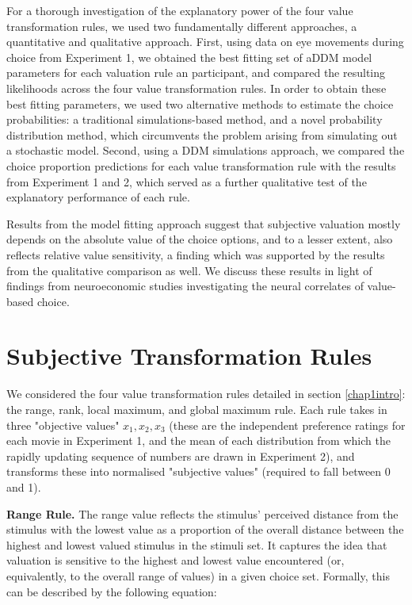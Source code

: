 \documentclass[11pt,a4paper]{article}
\begin{document}
For a thorough investigation of the explanatory power of the four value transformation rules, we used two fundamentally different approaches, a quantitative and qualitative approach. First, using data on eye movements during choice from Experiment 1, we obtained the best fitting set of aDDM model parameters for each valuation rule an participant, and compared the resulting likelihoods across the four value transformation rules. In order to obtain these best fitting parameters, we used two alternative methods to estimate the choice probabilities: a traditional simulations-based method, and a novel probability distribution method, which circumvents the problem arising from simulating out a stochastic model. Second, using a DDM simulations approach, we compared the choice proportion predictions for each value transformation rule with the results from Experiment 1 and 2, which served as a further qualitative test of the explanatory performance of each rule. 

Results from the model fitting approach suggest that subjective valuation mostly depends on the absolute value of the choice options, and to a lesser extent, also reflects  relative value sensitivity, a finding which was supported by the results from the qualitative comparison as well. We discuss these results in light of findings from neuroeconomic studies investigating the neural correlates of value-based choice.

\section{Subjective Transformation Rules} \label{chap1subjtrexplained}

We considered the four value transformation rules detailed in section \ref{chap1intro}: the range, rank, local maximum, and global maximum rule. Each rule takes in three "objective values" $x_1, x_2, x_3$  (these are the independent preference ratings for each movie in Experiment 1, and the mean of each distribution from which the rapidly updating sequence of numbers are drawn in Experiment 2), and transforms these into normalised "subjective values" (required to fall between 0 and 1). 

 \textbf{Range Rule.} The range value reflects the stimulus' perceived distance from the stimulus with the lowest value as a proportion of the overall distance between the highest and lowest valued stimulus in the stimuli set. It captures the idea that valuation is sensitive to the highest and lowest value encountered (or, equivalently, to the overall range of values) in a given choice set. Formally, this can be described by the following equation:
 
\end{document}
